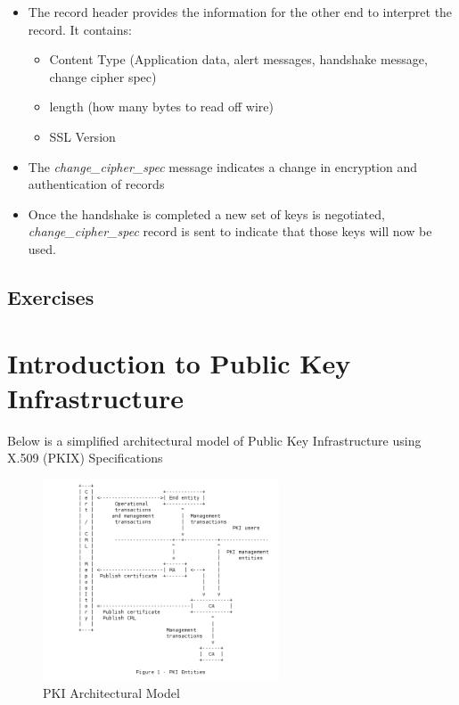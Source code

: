 \documentclass[a4paper]{article}
\begin{document}
\begin{itemize}
\begin{itemize}
                \item The record header provides the information for the other end to interpret the record. It contains:
                    \begin{itemize}
                        \item Content Type (Application data, alert messages, handshake message, change cipher spec)
                        \item length  (how many bytes to read off wire)
                        \item SSL Version
                    \end{itemize}
                \item The \textit{change\_cipher\_spec} message indicates a change in encryption and authentication of records
                \item Once the handshake is completed a new set of keys is negotiated, \textit{change\_cipher\_spec} record is 
                    sent to indicate that those keys will now be used.
            \end{itemize}
    \end{itemize}
\subsection{Exercises}
\section{Introduction to Public Key Infrastructure}
Below is a simplified architectural model of Public Key Infrastructure using X.509 (PKIX) Specifications
\begin{figure}[ht!]
    \centering
    \includegraphics[width=70mm]{pki-architectural-model.png}
    \caption{PKI Architectural Model}
\end{figure}
\end{document}
